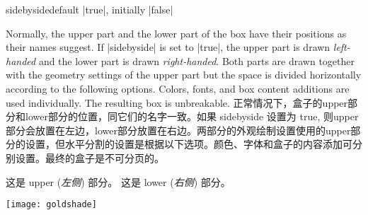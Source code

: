 \begin{docTcbKey}{sidebyside}{}{default |true|, initially |false|}
\begin{stripedbox}
Normally, the upper part and the lower part of the box have their positions
as their names suggest. If |sidebyside| is set to |true|, the upper part
is drawn \emph{left-handed} and the lower part is drawn \emph{right-handed}.
Both parts are drawn together with the geometry settings of the upper part but the
space is divided horizontally according to the following options.
Colors, fonts, and box content additions are used individually.
The resulting box is unbreakable.
\tcblower
正常情况下，盒子的upper部分和lower部分的位置，同它们的名字一致。如果 sidebyside 设置为 true, 则upper部分会放置在左边，lower部分放置在右边。两部分的外观绘制设置使用的upper部分的设置，但水平分割的设置是根据以下选项。颜色、字体和盒子的内容添加可分别设置。最终的盒子是不可分页的。
\end{stripedbox}

\begin{dispExample}

\begin{tcolorbox}[title=我的标题,sidebyside]
这是 upper (\textit{左侧}) 部分。
\tcblower
这是 lower (\textit{右侧}) 部分。
\end{tcolorbox}
\end{dispExample}


\begin{dispExample}
\begin{tcolorbox}[bicolor
,sidebyside%
,righthand width=3cm%
,sharp corners,boxrule=.4pt,colback=green!5,colbacklower=green!50!black!50]
\lipsum[2]
\tcblower
\texttt{[image: goldshade]}%
\end{tcolorbox}
\end{dispExample}
\end{docTcbKey}

